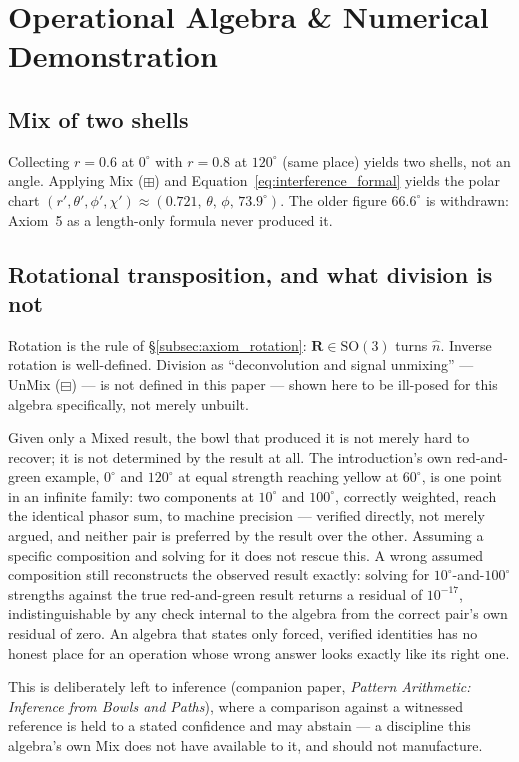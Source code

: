 \documentclass[12pt, a4paper]{article}
\begin{document}
\section{Operational Algebra \& Numerical Demonstration}

\subsection{Mix of two shells}
Collecting $r=0.6$ at $0^\circ$ with $r=0.8$ at $120^\circ$ (same
place) yields two shells, not an angle. Applying Mix ($\boxplus$) and
Equation~\eqref{eq:interference_formal} yields the polar chart
$(r',\theta',\phi',\chi')\approx(0.721,\,\theta,\,\phi,\,73.9^\circ)$.
The older figure $66.6^\circ$ is withdrawn: Axiom~5 as a length-only
formula never produced it.

\subsection{Rotational transposition, and what division is not}
\label{sec:unmixing}
\label{subsec:division_open}
Rotation is the rule of \S\ref{subsec:axiom_rotation}: $\mathbf{R}\in\mathrm{SO}(3)$
turns $\hat n$. Inverse rotation is well-defined. Division as
``deconvolution and signal unmixing'' --- UnMix ($\boxminus$) --- is
not defined in this paper --- shown here to be ill-posed for this
algebra specifically, not merely unbuilt.

Given only a Mixed result, the bowl that produced it is not merely
hard to recover; it is not determined by the result at all. The
introduction's own red-and-green example, $0^\circ$ and $120^\circ$
at equal strength reaching yellow at $60^\circ$, is one point in an
infinite family: two components at $10^\circ$ and $100^\circ$,
correctly weighted, reach the identical phasor sum, to machine
precision --- verified directly, not merely argued, and neither pair
is preferred by the result over the other. Assuming a specific
composition and solving for it does not rescue this. A wrong assumed
composition still reconstructs the observed result exactly: solving
for $10^\circ$-and-$100^\circ$ strengths against the true
red-and-green result returns a residual of $10^{-17}$, indistinguishable
by any check internal to the algebra from the correct pair's own
residual of zero. An algebra that states only forced, verified
identities has no honest place for an operation whose wrong answer
looks exactly like its right one.

This is deliberately left to inference (companion paper,
\emph{Pattern Arithmetic: Inference from Bowls and Paths}), where a
comparison against a witnessed reference is held to a stated
confidence and may abstain --- a discipline this algebra's own Mix
does not have available to it, and should not manufacture.
\end{document}
